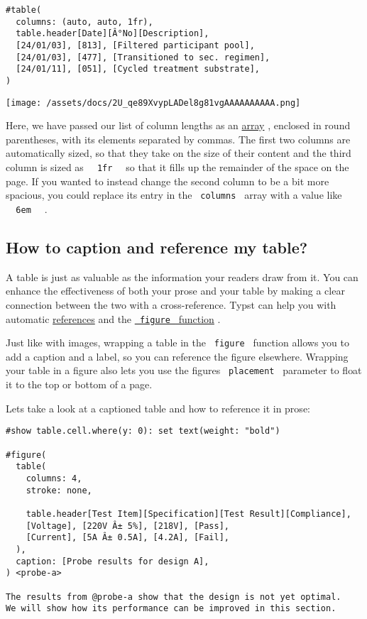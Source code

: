 \begin{verbatim}
#table(
  columns: (auto, auto, 1fr),
  table.header[Date][Â°No][Description],
  [24/01/03], [813], [Filtered participant pool],
  [24/01/03], [477], [Transitioned to sec. regimen],
  [24/01/11], [051], [Cycled treatment substrate],
)
\end{verbatim}

\texttt{[image: /assets/docs/2U\_qe89XvypLADel8g81vgAAAAAAAAAA.png]}

Here, we have passed our list of column lengths as an
\href{/docs/reference/foundations/array/}{array} , enclosed in round
parentheses, with its elements separated by commas. The first two
columns are automatically sized, so that they take on the size of their
content and the third column is sized as
\texttt{\ }{\texttt{\ 1fr\ }}\texttt{\ } so that it fills up the
remainder of the space on the page. If you wanted to instead change the
second column to be a bit more spacious, you could replace its entry in
the \texttt{\ columns\ } array with a value like
\texttt{\ }{\texttt{\ 6em\ }}\texttt{\ } .

\subsection{How to caption and reference my
table?}\label{captions-and-references}

A table is just as valuable as the information your readers draw from
it. You can enhance the effectiveness of both your prose and your table
by making a clear connection between the two with a cross-reference.
Typst can help you with automatic
\href{/docs/reference/model/ref/}{references} and the
\href{/docs/reference/model/figure/}{\texttt{\ figure\ } function} .

Just like with images, wrapping a table in the \texttt{\ figure\ }
function allows you to add a caption and a label, so you can reference
the figure elsewhere. Wrapping your table in a figure also lets you use
the figure\textquotesingle s \texttt{\ placement\ } parameter to float
it to the top or bottom of a page.

Let\textquotesingle s take a look at a captioned table and how to
reference it in prose:

\begin{verbatim}
#show table.cell.where(y: 0): set text(weight: "bold")

#figure(
  table(
    columns: 4,
    stroke: none,

    table.header[Test Item][Specification][Test Result][Compliance],
    [Voltage], [220V Â± 5%], [218V], [Pass],
    [Current], [5A Â± 0.5A], [4.2A], [Fail],
  ),
  caption: [Probe results for design A],
) <probe-a>

The results from @probe-a show that the design is not yet optimal.
We will show how its performance can be improved in this section.
\end{verbatim}

